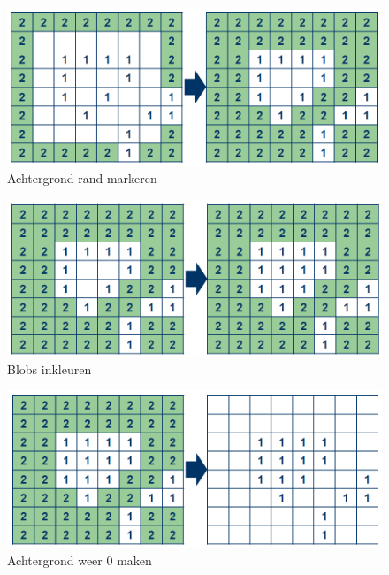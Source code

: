\begin{figure}
    \begin{center}
        \includegraphics[scale=0.35]{figures/fill_holes_step2.png}
    \end{center}
    \caption{Achtergrond rand markeren}
    \label{fig:fhstep2}
\end{figure}

\begin{figure}
    \begin{center}
        \includegraphics[scale=0.35]{figures/fill_holes_step3.png}
    \end{center}
    \caption{Blobs inkleuren}
    \label{fig:fhstep3}
\end{figure}

\begin{figure}
    \begin{center}
        \includegraphics[scale=0.35]{figures/fill_holes_step4.png}
    \end{center}
    \caption{Achtergrond weer 0 maken}
    \label{fig:fhstep4}
\end{figure}
